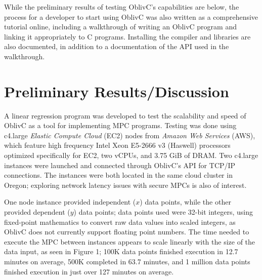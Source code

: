 \documentclass[conference]{IEEEtran}
\begin{document}
While the preliminary results of testing OblivC's capabilities are below, the process for
a developer to start using OblivC was also written as a comprehensive tutorial online\cite{tutorial:oblivc},
including a walkthrough of writing an OblivC program and linking it appropriately 
to C programs.
Installing the compiler and libraries are also documented, in addition to a documentation
of the API used in the walkthrough.

\section{Preliminary Results/Discussion}
A linear regression program was developed to test the scalability and speed of OblivC as a tool for implementing MPC programs. 
Testing was done using c4.large \emph{Elastic Compute Cloud} (EC2) nodes from \emph{Amazon Web Services} (AWS)\cite{aws:ec2}, which feature 
high frequency Intel Xeon E5-2666 v3 (Haswell) processors optimized specifically for EC2,
two vCPUs, and 3.75 GiB of DRAM.
Two c4.large instances were launched and connected through 
OblivC's API for TCP/IP connections. The instances were both located in the same cloud
cluster in Oregon; exploring network latency issues with secure MPCs is also of interest.

One node instance provided independent ($x$) data points, while the other provided dependent ($y$) data points; data points used were 32-bit integers, using fixed-point 
mathematics to convert raw data values into scaled integers, as 
OblivC does not currently support floating point numbers.
The time needed to execute the MPC between instances appears to scale linearly 
with the size of the data input, as seen in Figure 1; 100K data points finished execution in 12.7 minutes 
on average, 500K completed in 63.7 minutes, and 1 million data points finished execution 
in just over 127 minutes on average.
\end{document}
